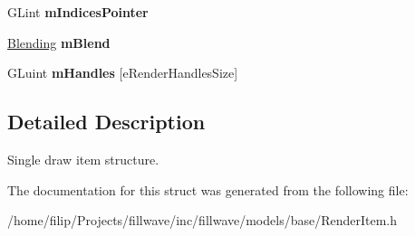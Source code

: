 \begin{DoxyCompactItemize}
\item 
G\+Lint {\bfseries m\+Indices\+Pointer}\hypertarget{structflw_1_1flf_1_1RenderItem_a03ee83918a408f0b8358396b3e25a2c9}{}\label{structflw_1_1flf_1_1RenderItem_a03ee83918a408f0b8358396b3e25a2c9}

\item 
\hyperlink{structflw_1_1flf_1_1Blending}{Blending} {\bfseries m\+Blend}\hypertarget{structflw_1_1flf_1_1RenderItem_a6418a83fa0555f4ea35bd5b0a0c1c113}{}\label{structflw_1_1flf_1_1RenderItem_a6418a83fa0555f4ea35bd5b0a0c1c113}

\item 
G\+Luint {\bfseries m\+Handles} \mbox{[}e\+Render\+Handles\+Size\mbox{]}\hypertarget{structflw_1_1flf_1_1RenderItem_ad1b5e8cf568c099ebefd386b1965e385}{}\label{structflw_1_1flf_1_1RenderItem_ad1b5e8cf568c099ebefd386b1965e385}

\end{DoxyCompactItemize}


\subsection{Detailed Description}
Single draw item structure. 

The documentation for this struct was generated from the following file\+:\begin{DoxyCompactItemize}
\item 
/home/filip/\+Projects/fillwave/inc/fillwave/models/base/Render\+Item.\+h\end{DoxyCompactItemize}
